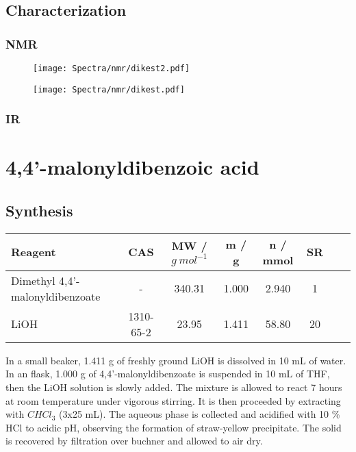 \documentclass[../Master.tex]{subfiles}
\begin{document}
\newpage
\subsection{Characterization}

\subsubsection{NMR}
\begin{figure}[h!]
	\centering
	\texttt{[image: Spectra/nmr/dikest2.pdf]}
\end{figure}
\begin{figure}[h!]
	\centering
	\texttt{[image: Spectra/nmr/dikest.pdf]}
\end{figure}

\subsubsection{IR}


\newpage
\section{4,4'-malonyldibenzoic acid}
\subsection{Synthesis}

\begin{center}
	\begin{tabular}[b]{lccccccc}
		\toprule
		Reagent                         & CAS       & MW / \(g \ mol^{-1}\) & m / g & n / mmol & SR \\
		\midrule
		Dimethyl 4,4'-malonyldibenzoate & -         & 340.31                & 1.000 & 2.940    & 1  \\
		LiOH                            & 1310-65-2 & 23.95                 & 1.411 & 58.80    & 20 \\
		\bottomrule
	\end{tabular}
\end{center}

In a small beaker, 1.411 g of freshly ground LiOH is dissolved in 10 mL of water. In an flask, 1.000 g of 4,4'-malonyldibenzoate is suspended in 10 mL of THF, then the LiOH solution is slowly added. The mixture is allowed to react 7 hours at room temperature under vigorous stirring. It is then proceeded by extracting with \(CHCl_{3}\) (3x25 mL). The aqueous phase is collected and acidified with 10 \% HCl to acidic pH, observing the formation of straw-yellow precipitate. The solid is recovered by filtration over buchner and allowed to air dry.
\end{document}
